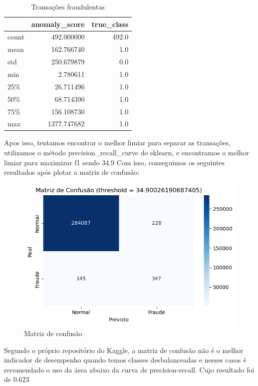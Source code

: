 \documentclass[conference]{IEEEtran}
\begin{document}
\begin{table}[tb]
    \caption{Transações fraudulentas}
    \label{tab:score_anomalia_fraude}
    \centering
    \begin{tabular}{lrr}
        \toprule
        & \textbf{anomaly\_score} & \textbf{true\_class} \\
        \midrule
        count & 492.000000 & 492.0 \\
        mean & 162.766740 & 1.0 \\
        std & 250.679879 & 0.0 \\
        min & 2.780611 & 1.0 \\
        25\% & 26.711496 & 1.0 \\
        50\% & 68.714390 & 1.0 \\
        75\% & 156.108730 & 1.0 \\
        max & 1377.747682 & 1.0 \\
        \bottomrule
    \end{tabular}
\end{table}
Apos isso, tentamos encontrar o melhor limiar para separar as transações, utilizamos o método precision\_recall\_curve do sklearn, e encontramos o melhor limiar para maximizar f1 sendo 34.9 Com isso, conseguimos os seguintes resultados após plotar a matriz de confusão:
\begin{figure}[H]
    \centerline{\includegraphics[width=0.8\linewidth]{../output/matriz de confusao maximo f1.png}}
    \caption{Matriz de confusão}
    \label{fig:matriz_confusao}
\end{figure}
Segundo o próprio repositório do Kaggle, a matriz de confusão não é o melhor indicador de desempenho quando temos classes desbalanceadas e nesses casos é recomendado o uso da área abaixo da curva de precision-recall. Cujo resultado foi de 0.623
\end{document}
